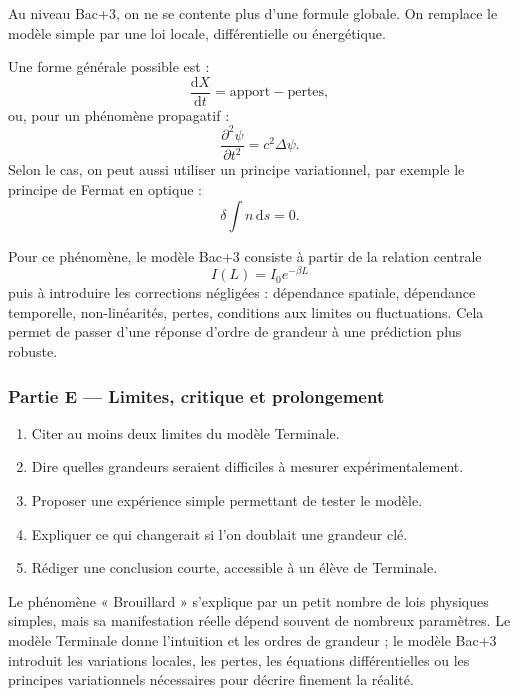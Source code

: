 \documentclass[11pt,a4paper]{article}
\begin{document}
\begin{approfondissementbox}
Au niveau Bac+3, on ne se contente plus d'une formule globale. On remplace le modèle simple par une loi locale, différentielle ou énergétique.

Une forme générale possible est :
\[
\frac{\mathrm d X}{\mathrm dt}=\text{apport}-\text{pertes},
\]
ou, pour un phénomène propagatif :
\[
\frac{\partial^2 \psi}{\partial t^2}=c^2\Delta\psi.
\]
Selon le cas, on peut aussi utiliser un principe variationnel, par exemple le principe de Fermat en optique :
\[
\delta \int n\,\mathrm ds=0.
\]

Pour ce phénomène, le modèle Bac+3 consiste à partir de la relation centrale
\[
I(L)=I_0e^{-\beta L}
\]
puis à introduire les corrections négligées : dépendance spatiale, dépendance temporelle, non-linéarités, pertes, conditions aux limites ou fluctuations. Cela permet de passer d'une réponse d'ordre de grandeur à une prédiction plus robuste.
\end{approfondissementbox}

\subsubsection*{Partie E — Limites, critique et prolongement}

\begin{enumerate}
  \item Citer au moins deux limites du modèle Terminale.
  \item Dire quelles grandeurs seraient difficiles à mesurer expérimentalement.
  \item Proposer une expérience simple permettant de tester le modèle.
  \item Expliquer ce qui changerait si l'on doublait une grandeur clé.
  \item Rédiger une conclusion courte, accessible à un élève de Terminale.
\end{enumerate}

\begin{corrigebox}
Le phénomène « Brouillard » s'explique par un petit nombre de lois physiques simples, mais sa manifestation réelle dépend souvent de nombreux paramètres. Le modèle Terminale donne l'intuition et les ordres de grandeur ; le modèle Bac+3 introduit les variations locales, les pertes, les équations différentielles ou les principes variationnels nécessaires pour décrire finement la réalité.
\end{corrigebox}
\end{document}
